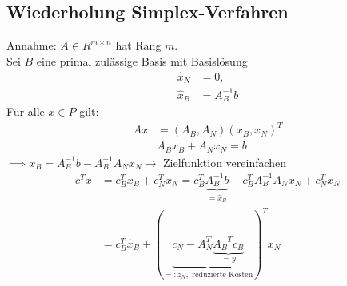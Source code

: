 \subsection{Wiederholung Simplex-Verfahren}
Annahme: $A \in R^{m \times n}$ hat Rang $m$.\\
Sei $B$ eine primal zulässige Basis mit Basislösung 
\begin{align*}
	\hat{x}_{N}&=0,\\
	\hat{x}_{B}&= A_{B}^{-1}b
\end{align*} 
Für alle $x \in P$ gilt:
\begin{align*}
	Ax&=(A_{B},A_{N})(x_{B},x_{N})^{T}\\
	  & A_{B}x_{B} + A_{N}x_{N}= b
\end{align*} 
$\implies x_{B} = A_{B}^{-1}b - A_{B}^{-1}A_{N}x_{N} \to$ Zielfunktion vereinfachen
\begin{align*}
	c^Tx&= c_{B}^Tx_{B} + c_{N}^Tx_{N} = c_{B}^T \underbrace{A_{B}^{-1}b}_{= \hat{x}_{B}} - c_{B}^TA_{B}^{-1}A_{N}x_{N} + c_{N}^Tx_{N}\\
		&= c^{T}_{B} \hat{x}_{B} +( \underbrace{ c_{N} - A_{N}^{T} \underbrace{A_{B}^{-T}c_{B}}_{=y} }_{=: z_{N}, \text{ reduzierte Kosten}} )^{T} x_{N} 
\end{align*} 

